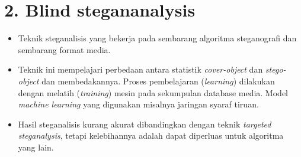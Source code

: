 \documentclass{article}
\begin{document}

\section*{2. Blind stegananalysis}

\begin{itemize}
    \item Teknik steganalisis yang bekerja pada sembarang algoritma steganografi dan sembarang format media.
    \item Teknik ini mempelajari perbedaan antara statistik \textit{cover-object} dan \textit{stego-object} dan membedakannya. Proses pembelajaran (\textit{learning}) dilakukan dengan melatih (\textit{training}) mesin pada sekumpulan database media. Model \textit{machine learning} yang digunakan misalnya jaringan syaraf tiruan.
    \item Hasil steganalisis kurang akurat dibandingkan dengan teknik \textit{targeted steganalysis}, tetapi kelebihannya adalah dapat diperluas untuk algoritma yang lain.
\end{itemize}
\end{document}
